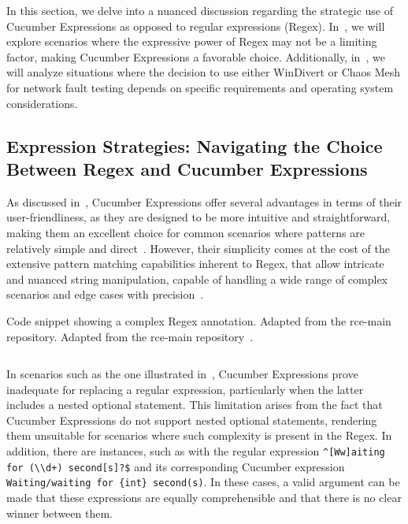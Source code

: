 In this section, we delve into a nuanced discussion regarding the strategic use of Cucumber Expressions as opposed to regular expressions (\ac{Regex}). In~, we will explore scenarios where the expressive power of \ac{Regex} may not be a limiting factor, making Cucumber Expressions a favorable choice. Additionally, in~, we will analyze situations where the decision to use either WinDivert or Chaos Mesh for network fault testing depends on specific requirements and operating system considerations.

\subsection{Expression Strategies: Navigating the Choice Between \ac{Regex} and Cucumber Expressions}
\label{subsec:expression-strategies}

As discussed in~, Cucumber Expressions offer several advantages in terms of their user-friendliness, as they are designed to be more intuitive and straightforward, making them an excellent choice for common scenarios where patterns are relatively simple and direct~\cite{githubGitHubCucumbercucumberexpressions}. However, their simplicity comes at the cost of the extensive pattern matching capabilities inherent to \ac{Regex}, that allow intricate and nuanced string manipulation, capable of handling a wide range of complex scenarios and edge cases with precision~\cite{githubGitHubCucumbercucumberexpressions}. 

\begin{listing}[!ht]
\caption{Code snippet showing a complex \ac{Regex} annotation. Adapted from the rce-main repository. Adapted from the rce-main repository~\cite{githubGitHubRcenvironmentrcemain}.}
\label{lst:complexRegex}
\inputminted[linenos, xleftmargin=2em]{java}{files/code/complexRegex.java}
\end{listing}

In scenarios such as the one illustrated in~, Cucumber Expressions prove inadequate for replacing a regular expression, particularly when the latter includes a nested optional statement. This limitation arises from the fact that Cucumber Expressions do not support nested optional statements, rendering them unsuitable for scenarios where such complexity is present in the \ac{Regex}. In addition, there are instances, such as with the regular expression \verb|^[Ww]aiting for (\\d+) second[s]?$| and its corresponding Cucumber expression \verb|Waiting/waiting for {int} second(s)|. In these cases, a valid argument can be made that these expressions are equally comprehensible and that there is no clear winner between them.

